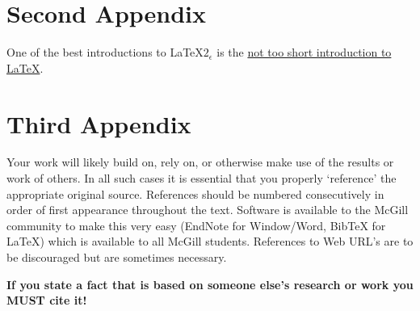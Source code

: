 \documentclass[12pt]{article}
\begin{document}
\section{Second Appendix}
One of the best introductions to \LaTeX$2_{\epsilon}$  is the \href{http://www.ctan.org/tex-archive/info/lshort/}{not too short introduction to \LaTeX}.
\section{Third Appendix}
Your work will likely build on, rely on, or otherwise make use of the results or work of others.  In all such cases it is essential that you properly ‘reference’ the appropriate original source.  References should be numbered consecutively in order of first appearance throughout the text. Software is available to the McGill community to make this very easy (EndNote for Window/Word, BibTeX for LaTeX) which is available to all McGill students.  References to Web URL’s are to be discouraged but are sometimes necessary.

\textbf{If you state a fact that is based on someone else's research or work you MUST cite it!}
\end{document}
